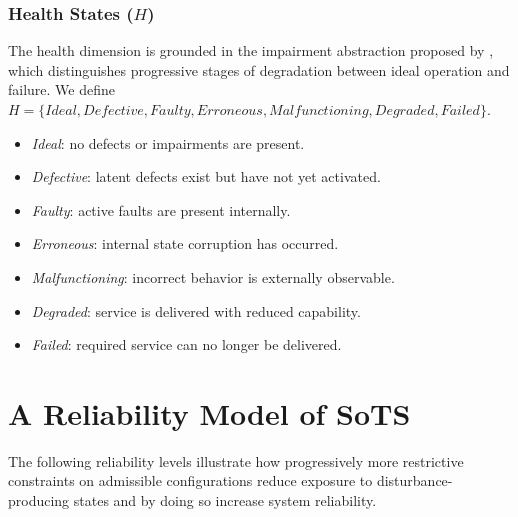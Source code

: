 \subsubsection{Health States (\( H \))}
The health dimension is grounded in the impairment abstraction proposed by \citet{parhami1994multi}, which distinguishes progressive stages of degradation between ideal operation and failure. We define
\( H = \{\textit{Ideal}, \textit{Defective}, \textit{Faulty}, \textit{Erroneous}, \textit{Malfunctioning}, \textit{Degraded}, \textit{Failed}\} \). 

\begin{itemize}[noitemsep]
    \item \textit{Ideal}: no defects or impairments are present.
    \item \textit{Defective}: latent defects exist but have not yet activated.
    \item \textit{Faulty}: active faults are present internally.
    \item \textit{Erroneous}: internal state corruption has occurred.
    \item \textit{Malfunctioning}: incorrect behavior is externally observable.
    \item \textit{Degraded}: service is delivered with reduced capability.
    \item \textit{Failed}: required service can no longer be delivered.
\end{itemize}

\section{A Reliability Model of SoTS}


The following reliability levels illustrate how progressively more restrictive constraints on admissible configurations reduce exposure to disturbance-producing states and by doing so increase system reliability.

